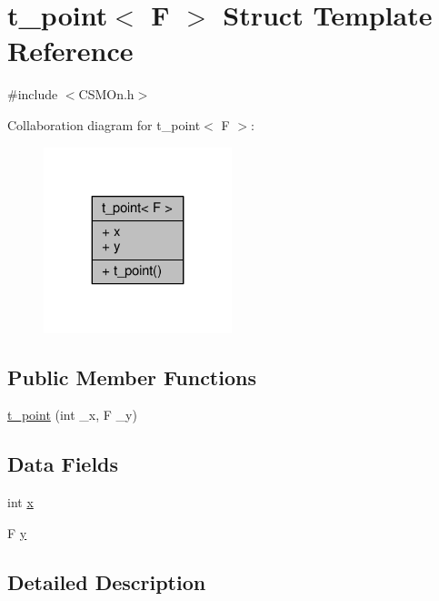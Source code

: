 \hypertarget{structt__point}{}\section{t\+\_\+point$<$ F $>$ Struct Template Reference}
\label{structt__point}


{\ttfamily \#include $<$C\+S\+M\+On.\+h$>$}



Collaboration diagram for t\+\_\+point$<$ F $>$\+:\nopagebreak
\begin{figure}[H]
\begin{center}
\leavevmode
\includegraphics[width=155pt]{structt__point__coll__graph}
\end{center}
\end{figure}
\subsection*{Public Member Functions}
\begin{DoxyCompactItemize}
\item 
\hyperlink{structt__point_af5c0909d426a10340846bc6f2bb765e6}{t\+\_\+point} (int \+\_\+x, F \+\_\+y)
\end{DoxyCompactItemize}
\subsection*{Data Fields}
\begin{DoxyCompactItemize}
\item 
int \hyperlink{structt__point_aacf212cab9b48c1116cd7c1ab8861b24}{x}
\item 
F \hyperlink{structt__point_a17c8b258b76ba9d626ff9ddcdd7900e0}{y}
\end{DoxyCompactItemize}


\subsection{Detailed Description}
